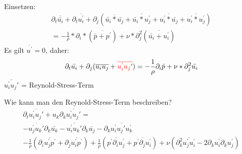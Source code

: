 \documentclass[12pt,t]{beamer}
\begin{document}
\begin{frame}
Einsetzen:
\begin{align}
\partial_t \overline{\bar{u_i}} + \partial_t \overline{u_i^{'}}+ \partial_j (\overline{\bar{u_i}*\bar{u_j}} + \overline{\bar{u_i}*u_j^{'}} + \overline{u_i^{'}*\bar{u_j}} + \overline{u_i^{'}*u_j^{'}}) \\
= - \frac{1}{\rho}*\partial_i*(\overline{\bar{p}+p^{'}}) + \nu*\partial_j^2  (\overline{\bar{u_i}+u_i^{'}})
\end{align}
Es gilt $\overline{u^{'}} = 0$, daher:
\begin{align}
\partial_t \bar{u_i} + \partial_j (\overline{u_iu_j}+{\color{red}\overline{u_i^{'}u_j{'}}}) = - \frac{1}{\rho} \partial_i \bar{p}+\nu*\partial_j^2\bar{u_i}
\end{align}
$\overline{u_i^{'}u_j{'}}$ = Reynold-Stress-Term
\end{frame}
\begin{frame}
Wie kann man den Reynold-Stress-Term beschreiben?
\begin{align}
\partial_t\overline{u_i^{'}u_j{'}}+u_k\partial_k\overline{u_i^{'}u_j{'}} =\\ -\overline{u_j^{'}u_k{'}}\partial_k\bar{u_k}
-\overline{u_i^{'}u_k{'}}\partial_k\overline{u_j}-\partial_k\overline{u_i^{'}u_j{'}u_k^{'}} \\- \frac{1}{\rho}(\partial_i\overline{u_j^{'}p^{'}}+\partial_j\overline{u_i^{'}p^{'}})+\frac{1}{\rho}(\overline{p^{'}\partial_iu_j^{'}}+\overline{p^{'}\partial_ju_i^{'}})+\nu(\partial_k^{2}\overline{u_j^{'}u_i^{'}}-2\overline{\partial_ku_i^{'}\partial_ku_j^{'}})
\end{align}

\end{frame}




\end{document}

